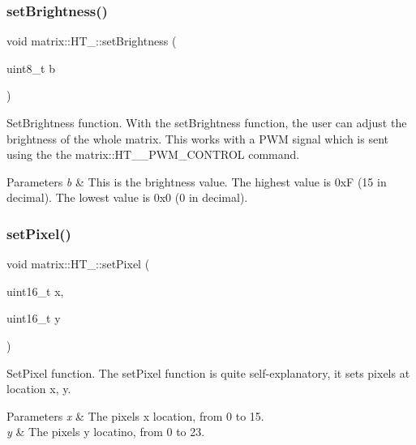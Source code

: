 \subsubsection{\texorpdfstring{set\+Brightness()}{setBrightness()}}
{\footnotesize\ttfamily void matrix\+::\+H\+T\+\_\+::set\+Brightness (\begin{DoxyParamCaption}\item[{uint8\+\_\+t}]{b }\end{DoxyParamCaption})}



Set\+Brightness function. With the set\+Brightness function, the user can adjust the brightness of the whole matrix. This works with a P\+WM signal which is sent using the the matrix\+::\+H\+T\+\_\+\_\+\+P\+W\+M\+\_\+\+C\+O\+N\+T\+R\+OL command. 


\begin{DoxyParams}{Parameters}
{\em b} & This is the brightness value. The highest value is 0xF (15 in decimal). The lowest value is 0x0 (0 in decimal). \\
\hline
\end{DoxyParams}
\mbox{\label{group___h_t__1632_ga41e8cf0207f395b420124b73555abea1}} 
\subsubsection{\texorpdfstring{set\+Pixel()}{setPixel()}}
{\footnotesize\ttfamily void matrix\+::\+H\+T\+\_\+::set\+Pixel (\begin{DoxyParamCaption}\item[{uint16\+\_\+t}]{x,  }\item[{uint16\+\_\+t}]{y }\end{DoxyParamCaption})}



Set\+Pixel function. The set\+Pixel function is quite self-\/explanatory, it sets pixels at location x, y. 


\begin{DoxyParams}{Parameters}
{\em x} & The pixel\textquotesingle{}s x location, from 0 to 15. \\
\hline
{\em y} & The pixel\textquotesingle{}s y locatino, from 0 to 23. \\
\hline
\end{DoxyParams}
\mbox{\label{group___h_t__1632_gac3d327b762c8245ddc6f88ba26c46e82}} 
